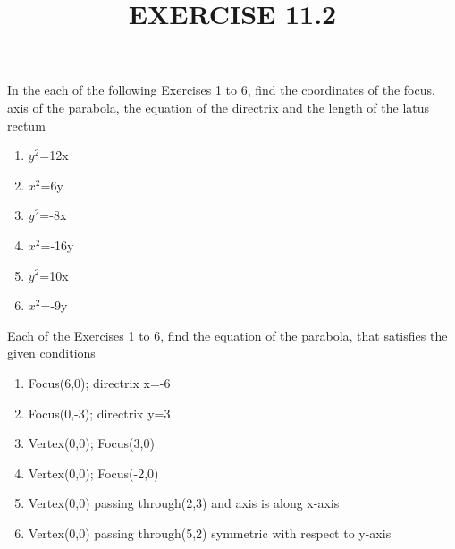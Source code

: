 \documentclass[12pt]{article}
\begin{document}
\begin{center}
\title{\textbf{EXERCISE 11.2}}
\date{\vspace{-5ex}} %
\maketitle
\end{center}

\setcounter{page}{1}

In the each of the following Exercises 1 to 6, find the coordinates of the focus, axis of the parabola, the equation of the directrix and the length of the latus rectum

\begin{enumerate}
\item $y^2$=12x 

\item $x^2$=6y 
\
\item $y^2$=-8x

\item $x^2$=-16y

\item $y^2$=10x  

\item $x^2$=-9y  

\end{enumerate}



Each of the Exercises 1 to 6, find the equation of the parabola, that satisfies the given conditions

\begin{enumerate}

\item Focus(6,0); directrix x=-6 
\item Focus(0,-3); directrix y=3
\item Vertex(0,0); Focus(3,0)
\item Vertex(0,0); Focus(-2,0) 
\item Vertex(0,0) passing through(2,3) and axis is along x-axis
\item Vertex(0,0) passing through(5,2) symmetric with respect to y-axis
\end{enumerate}
\end{document}
